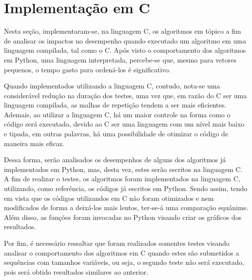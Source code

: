 \section{Implementação em C}
Nesta seção, implementaram-se, na linguagem C, os algoritmos em tópico a fim de analisar os impactos no desempenho quando executado um algoritmo em uma linguagem compilada, tal como o C.
Após visto o comportamento dos algoritmos em Python, uma linguagem interpretada, percebe-se que, mesmo para vetores pequenos, o tempo gasto para ordená-los é significativo.

Quando implementados utilizando a linguagem C, contudo, nota-se uma considerável redução na duração dos testes, uma vez que, em razão do C ser uma linguagem compilada, as malhas de repetição tendem a ser mais eficientes.
Ademais, ao utilizar a linguagem C, há um maior controle na forma como o código será executado, devido ao C ser uma linguagem com um nível mais baixo e tipada, em outras palavras, há uma possibilidade de otimizar o código de maneira mais eficaz.


Dessa forma, serão analisados os desempenhos de alguns dos algoritmos já implementados em Python, mas, desta vez, estes serão escritos na linguagem C.
A fim de realizar o testes, os algoritmos foram implementados na linguagem C, utilizando, como referência, os códigos já escritos em Python. Sendo assim, tendo em vista que os códigos utilizandos em C não foram otimizados e nem modificados de forma a deixá-los mais lentos, ter-se-á uma comparação equânime.
Além disso, as funções foram invocadas no Python visando criar os gráficos dos resultados.

Por fim, é necessário ressaltar que foram realizados somentes testes visando analisar o comportamento dos algoritmos em C quando estes são submetidos a sequências com tamanhos variáveis, ou seja, o segundo teste não será executado, pois será obtido resultados similares ao anterior.

\newpage
